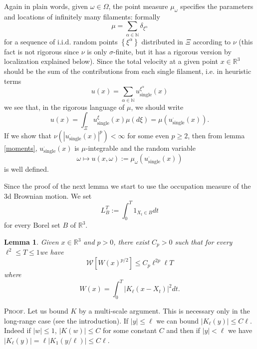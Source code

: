 \documentclass[a4paper,12pt]{article}
\newtheorem{lemma}{Lemma}
\begin{document}
Again in plain words, given $\omega\in\Omega$, the point measure $\mu_{\omega
}$ specifies the parameters and locations of infinitely many filaments:
formally
\begin{equation}
\mu=\sum_{\alpha\in\mathbb{N}}\delta_{\xi^{\alpha}} \label{muformal}%
\end{equation}
for a sequence of i.i.d. random points $\left\{  \xi^{\alpha}\right\}  $
distributed in $\Xi$ according to $\nu$ (this fact is not rigorous since $\nu$
is only $\sigma$-finite, but it has a rigorous version by localization
explained below). Since the total velocity at a given point $x\in
\mathbb{R}^{3}$ should be the sum of the contributions from each single
filament, i.e. in heuristic terms
\begin{equation}
u(x)=\sum_{\alpha\in\mathbb{N}}u_{\text{single}}^{\xi^{\alpha}}\left(
x\right)  \label{uformal}%
\end{equation}
we see that, in the rigorous language of $\mu$, we should write
\begin{equation}
u(x)=\int_{\Xi}u_{\text{single}}^{\xi}\left(  x\right)  \mu(d\xi)=\mu\left(
u_{\text{single}}^{\cdot}\left(  x\right)  \right)  .
\end{equation}
If we show that $\nu\left(  \left|  u_{\text{single}}^{\cdot}\left(  x\right)
\right|  ^{p}\right)  <\infty$ for some even $p\geq2$, then from lemma
\ref{moments}, $u_{\text{single}}^{\cdot}\left(  x\right)  $ is $\mu
$-integrable and the random variable
\[
\omega\mapsto u(x,\omega):=\mu_{\omega}\left(  u_{\text{single}}^{\cdot
}\left(  x\right)  \right)
\]
is well defined.

Since the proof of the next lemma we start to use the occupation measure of
the 3d Brownian motion. We set
\[
L_{B}^{T}:=\int_{0}^{T}1_{X_{t}\in B}dt
\]
for every Borel set $B$ of $\mathbb{R}^{3}$.

\begin{lemma}
\label{singlebound}Given $x\in\mathbb{R}^{3}$ and $p>0$, there exist $C_{p}>0$
such that for every $\ell^{2}\leq T\leq1$we have
\[
\mathcal{W}\left[  W(x)^{p/2}\right]  \leq C_{p}\ell^{2p}\ell T
\]
where
\[
W(x)=\int_{0}^{T}\left|  K_{\ell}(x-X_{t})\right|  ^{2}dt.
\]
\end{lemma}

\textsc{Proof. }Let us bound $K$ by a multi-scale argument. This is necessary
only in the long-range case (see the introduction). If $|y|\leq\ell$ we can
bound $|K_{\ell}(y)|\leq C\ell$. Indeed if $|w|\leq1$, $|K(w)|\leq C$ for some
constant $C$ and then if $|y|<\ell$ we have $|K_{\ell}(y)|=\ell|K_{1}%
(y/\ell)|\leq C\ell$.
\end{document}

